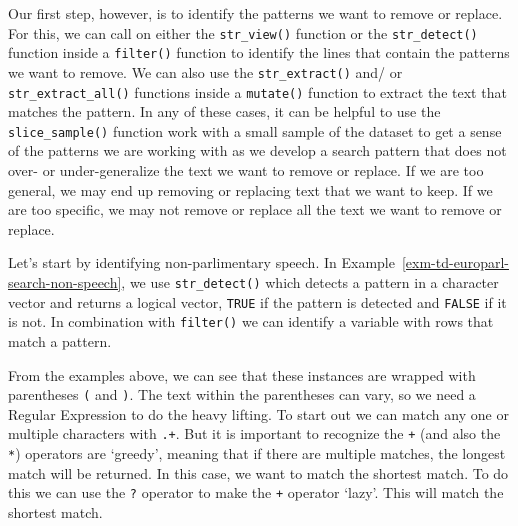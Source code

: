\documentclass[
  letterpaper,
]{latex/krantz}
\theoremstyle{definition}
\theoremstyle{remark}
\begin{document}
Our first step, however, is to identify the patterns we want to remove
or replace. For this, we can call on either the \texttt{str\_view()}
function or the \texttt{str\_detect()} function inside a
\texttt{filter()} function to identify the lines that contain the
patterns we want to remove. We can also use the \texttt{str\_extract()}
and/ or \texttt{str\_extract\_all()} functions inside a
\texttt{mutate()} function to extract the text that matches the pattern.
In any of these cases, it can be helpful to use the
\texttt{slice\_sample()} function work with a small sample of the
dataset to get a sense of the patterns we are working with as we develop
a search pattern that does not over- or under-generalize the text we
want to remove or replace. If we are too general, we may end up removing
or replacing text that we want to keep. If we are too specific, we may
not remove or replace all the text we want to remove or replace.

Let's start by identifying non-parlimentary speech. In
Example~\ref{exm-td-europarl-search-non-speech}, we use
\texttt{str\_detect()} which detects a pattern in a character vector and
returns a logical vector, \texttt{TRUE} if the pattern is detected and
\texttt{FALSE} if it is not. In combination with \texttt{filter()} we
can identify a variable with rows that match a pattern.

From the examples above, we can see that these instances are wrapped
with parentheses \texttt{(} and \texttt{)}. The text within the
parentheses can vary, so we need a Regular Expression to do the heavy
lifting. To start out we can match any one or multiple characters with
\texttt{.+}. But it is important to recognize the \texttt{+} (and also
the \texttt{*}) operators are `greedy', meaning that if there are
multiple matches, the longest match will be returned. In this case, we
want to match the shortest match. To do this we can use the \texttt{?}
operator to make the \texttt{+} operator `lazy'. This will match the
shortest match.
\end{document}

